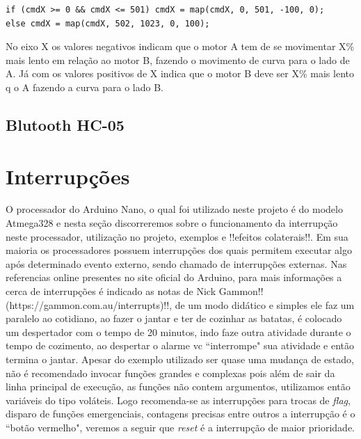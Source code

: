 \documentclass[a4paper,12pt,portuguese]{ufms-cpcx}
\begin{document}
\begin{lstlisting}
if (cmdX >= 0 && cmdX <= 501) cmdX = map(cmdX, 0, 501, -100, 0);
else cmdX = map(cmdX, 502, 1023, 0, 100);
\end{lstlisting}
No eixo X os valores negativos indicam que o motor A tem de se movimentar X\% mais lento em relação ao motor B, fazendo o movimento de curva para o lado de A. Já com os valores positivos de X indica que o motor B deve ser X\% mais lento q o A fazendo a curva para o lado B.

\section{Blutooth HC-05}\label{bthc05}


\chapter{Interrupções}
O processador do Arduino Nano, o qual foi utilizado neste projeto é do modelo Atmega328 e nesta seção discorreremos sobre o funcionamento da interrupção neste processador, utilização no projeto, exemplos e !!efeitos colaterais!!.
Em sua maioria os processadores possuem interrupções dos quais permitem executar algo após determinado evento externo, sendo chamado de interrupções externas. Nas referencias online presentes no site oficial do Arduino, para mais informações a cerca de interrupções é indicado as notas de Nick Gammon!!(https://gammon.com.au/interrupts)!!, de um modo didático e simples ele faz um paralelo ao cotidiano, ao fazer o jantar e ter de cozinhar as batatas, é colocado um despertador com o tempo de 20 minutos, indo faze outra atividade durante o tempo de cozimento, ao despertar o alarme vc ``interrompe" sua atividade e então termina o jantar. Apesar do exemplo utilizado ser quase uma mudança de estado, não é recomendado invocar funções grandes e complexas pois além de sair da linha principal de execução, as funções não contem argumentos, utilizamos então variáveis do tipo voláteis. Logo recomenda-se as interrupções para trocas de \textit{flag}, disparo de funções emergenciais, contagens precisas entre outros a interrupção é o ``botão vermelho", veremos a seguir que \textit{reset} é a interrupção de maior prioridade.
\end{document}
